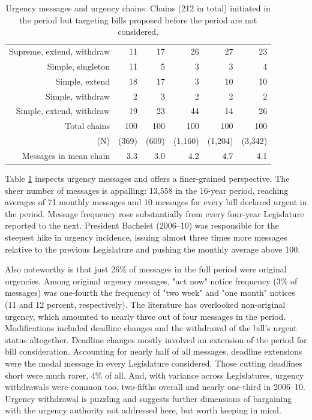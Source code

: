 \documentclass[letter,12pt]{article}
\begin{document}
\begin{table}
\begin{tabular}{rrrrr|r}
Supreme, extend, withdraw   & 11 & 17 & 26 & 27 &  23  \\ \hdashline
Simple, singleton           & 11 & 5  & 3  & 3  &   4  \\
Simple, extend              & 18 & 17 & 3  & 10 &  10  \\
Simple, withdraw            & 2  & 3  & 2  & 2  &   2  \\
Simple, extend, withdraw    & 19 & 23 & 44 & 14 &  26  \\ \hline
Total chains                & 100 & 100 & 100 & 100 & 100  \\
(N)                         & (369) & (609) & (1,160) & (1,204) &(3,342) \\ 
Messages in mean chain      & 3.3   & 3.0   & 4.2     & 4.7     & 4.1 \\ \hline
\end{tabular}
\caption{Urgency messages and urgency chains. Chains (212 in total) initiated in the period but targeting bills proposed before the period are not considered.}\label{t:freqUrg}
\end{table}

Table \ref{t:freqUrg} inspects urgency messages and offers a finer-grained perspective. The sheer number of messages is appalling: 13,558 in the 16-year period, reaching averages of 71 monthly messages and 10 messages for every bill declared urgent in the period. Message frequency rose substantially from every four-year Legislature reported to the next. President Bachelet (2006--10) was responsible for the steepest hike in urgency incidence, issuing almost three times more messages relative to the previous Legislature and pushing the monthly average above 100. 

Also noteworthy is that just 26\% of messages in the full period were original urgencies. Among original urgency messages, "act now" notice frequency (3\% of messages) was one-fourth the frequency of "two week" and "one month" notices (11 and 12 percent, respectively). The literature has overlooked non-original urgency, which amounted to nearly three out of four messages in the period. Modifications included deadline changes and the withdrawal of the bill's urgent status altogether. Deadline changes mostly involved an extension of the period for bill consideration. Accounting for nearly half of all messages, deadline extensions were the modal message in every Legislature considered. Those cutting deadlines short were much rarer, 4\% of all. And, with variance across Legislatures, urgency withdrawals were common too, two-fifths overall and nearly one-third in 2006--10. Urgency withdrawal is puzzling and suggests further dimensions of bargaining with the urgency authority not addressed here, but worth keeping in mind. 
\end{document}
